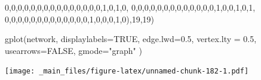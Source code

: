 \documentclass[
  notitlepage,
  onecolumn,
  openany]{book}
\newenvironment{Shaded}{\begin{snugshade}}{\end{snugshade}}
\newcommand{\AttributeTok}[1]{\textcolor[rgb]{0.77,0.63,0.00}{#1}}
\newcommand{\ConstantTok}[1]{\textcolor[rgb]{0.00,0.00,0.00}{#1}}
\newcommand{\DecValTok}[1]{\textcolor[rgb]{0.00,0.00,0.81}{#1}}
\newcommand{\FloatTok}[1]{\textcolor[rgb]{0.00,0.00,0.81}{#1}}
\newcommand{\FunctionTok}[1]{\textcolor[rgb]{0.00,0.00,0.00}{#1}}
\newcommand{\NormalTok}[1]{#1}
\newcommand{\SpecialCharTok}[1]{\textcolor[rgb]{0.00,0.00,0.00}{#1}}
\newcommand{\StringTok}[1]{\textcolor[rgb]{0.31,0.60,0.02}{#1}}
\begin{document}
\begin{Shaded}
\begin{Highlighting}[]
  \DecValTok{0}\NormalTok{,}\DecValTok{0}\NormalTok{,}\DecValTok{0}\NormalTok{,}\DecValTok{0}\NormalTok{,}\DecValTok{0}\NormalTok{,}\DecValTok{0}\NormalTok{,}\DecValTok{0}\NormalTok{,}\DecValTok{0}\NormalTok{,}\DecValTok{0}\NormalTok{,}\DecValTok{0}\NormalTok{,}\DecValTok{0}\NormalTok{,}\DecValTok{0}\NormalTok{,}\DecValTok{0}\NormalTok{,}\DecValTok{0}\NormalTok{,}\DecValTok{0}\NormalTok{,}\DecValTok{1}\NormalTok{,}\DecValTok{0}\NormalTok{,}\DecValTok{1}\NormalTok{,}\DecValTok{0}\NormalTok{,}
  \DecValTok{0}\NormalTok{,}\DecValTok{0}\NormalTok{,}\DecValTok{0}\NormalTok{,}\DecValTok{0}\NormalTok{,}\DecValTok{0}\NormalTok{,}\DecValTok{0}\NormalTok{,}\DecValTok{0}\NormalTok{,}\DecValTok{0}\NormalTok{,}\DecValTok{0}\NormalTok{,}\DecValTok{0}\NormalTok{,}\DecValTok{0}\NormalTok{,}\DecValTok{0}\NormalTok{,}\DecValTok{0}\NormalTok{,}\DecValTok{1}\NormalTok{,}\DecValTok{0}\NormalTok{,}\DecValTok{0}\NormalTok{,}\DecValTok{1}\NormalTok{,}\DecValTok{0}\NormalTok{,}\DecValTok{1}\NormalTok{,}
  \DecValTok{0}\NormalTok{,}\DecValTok{0}\NormalTok{,}\DecValTok{0}\NormalTok{,}\DecValTok{0}\NormalTok{,}\DecValTok{0}\NormalTok{,}\DecValTok{0}\NormalTok{,}\DecValTok{0}\NormalTok{,}\DecValTok{0}\NormalTok{,}\DecValTok{0}\NormalTok{,}\DecValTok{0}\NormalTok{,}\DecValTok{0}\NormalTok{,}\DecValTok{0}\NormalTok{,}\DecValTok{0}\NormalTok{,}\DecValTok{1}\NormalTok{,}\DecValTok{0}\NormalTok{,}\DecValTok{0}\NormalTok{,}\DecValTok{0}\NormalTok{,}\DecValTok{1}\NormalTok{,}\DecValTok{0}\NormalTok{),}\DecValTok{19}\NormalTok{,}\DecValTok{19}\NormalTok{)}

\FunctionTok{gplot}\NormalTok{(network,}
      \AttributeTok{displaylabels=}\ConstantTok{TRUE}\NormalTok{,}
      \AttributeTok{edge.lwd=}\FloatTok{0.5}\NormalTok{,}
      \AttributeTok{vertex.lty =} \FloatTok{0.5}\NormalTok{,}
      \AttributeTok{usearrows=}\ConstantTok{FALSE}\NormalTok{, }
      \AttributeTok{gmode=}\StringTok{"graph"}
\NormalTok{)}
\end{Highlighting}
\end{Shaded}

\texttt{[image: \_main\_files/figure-latex/unnamed-chunk-182-1.pdf]}

\begin{Shaded}
\end{Shaded}
\end{document}
